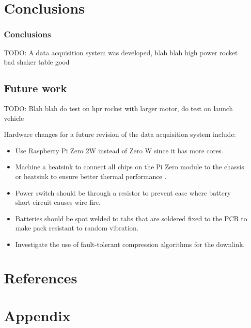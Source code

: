 \documentclass[a4paper,11pt]{article}
\begin{document}
\section{Conclusions}

\subsubsection{Conclusions}

TODO: A data acquisition system was developed, blah blah high power rocket bad shaker table good

\subsection{Future work}

TODO: Blah blah do test on hpr rocket with larger motor, do test on launch vehicle

Hardware changes for a future revision of the data acquisition system include:

\begin{itemize}
  \item Use Raspberry Pi Zero 2W instead of Zero W since it has more cores.
  \item Machine a heatsink to connect all chips on the Pi Zero module to the chassis or heatsink to ensure better thermal performance \cite{guertin2022raspberry}.
  \item Power switch should be through a resistor to prevent case where battery short circuit causes wire fire.
  \item Batteries should be spot welded to tabs that are soldered fixed to the PCB to make pack resistant to random vibration.
  \item Investigate the use of fault-tolerant compression algorithms for the downlink. %
\end{itemize}

\section{References}

\printbibliography[heading=none]

\section{Appendix}
\end{document}
